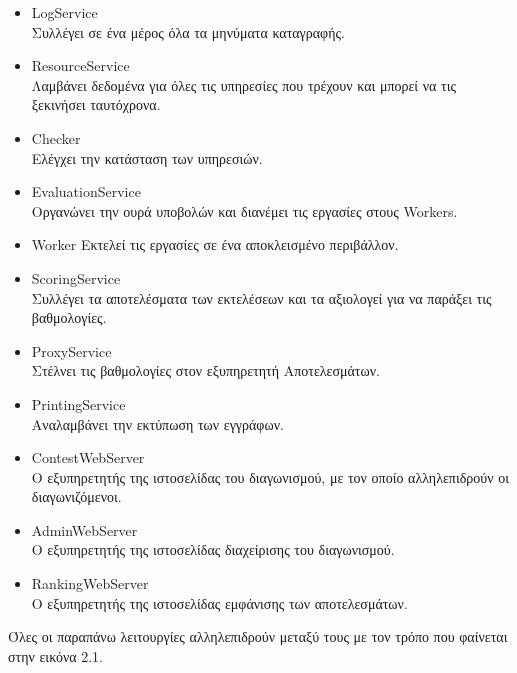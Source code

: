 \documentclass[diploma]{softlab-thesis}
\begin{document}
\begin{itemize}
    \setlength\itemsep{0em}
    \item LogService \\
      Συλλέγει σε ένα μέρος όλα τα μηνύματα καταγραφής.
    \item ResourceService \\
      Λαμβάνει δεδομένα για όλες τις υπηρεσίες που τρέχουν και μπορεί να τις
      ξεκινήσει ταυτόχρονα.
    \item Checker \\
      Ελέγχει την κατάσταση των υπηρεσιών.
    \item EvaluationService \\
      Οργανώνει την ουρά υποβολών και διανέμει τις εργασίες στους Workers.
    \item Worker
      Εκτελεί τις εργασίες σε ένα αποκλεισμένο περιβάλλον.
    \item ScoringService \\
      Συλλέγει τα αποτελέσματα των εκτελέσεων και τα αξιολογεί για να παράξει
      τις βαθμολογίες.
    \item ProxyService \\
      Στέλνει τις βαθμολογίες στον εξυπηρετητή Αποτελεσμάτων.
    \item PrintingService \\
      Αναλαμβάνει την εκτύπωση των εγγράφων.
    \item ContestWebServer \\
      Ο εξυπηρετητής της ιστοσελίδας του διαγωνισμού, με τον οποίο αλληλεπιδρούν
      οι διαγωνιζόμενοι.
    \item AdminWebServer \\
      Ο εξυπηρετητής της ιστοσελίδας διαχείρισης του διαγωνισμού.
    \item RankingWebServer \\
      Ο εξυπηρετητής της ιστοσελίδας εμφάνισης των αποτελεσμάτων.
\end{itemize}

\bigskip

Όλες οι παραπάνω λειτουργίες αλληλεπιδρούν μεταξύ τους με τον τρόπο που φαίνεται
στην εικόνα 2.1.
\end{document}
